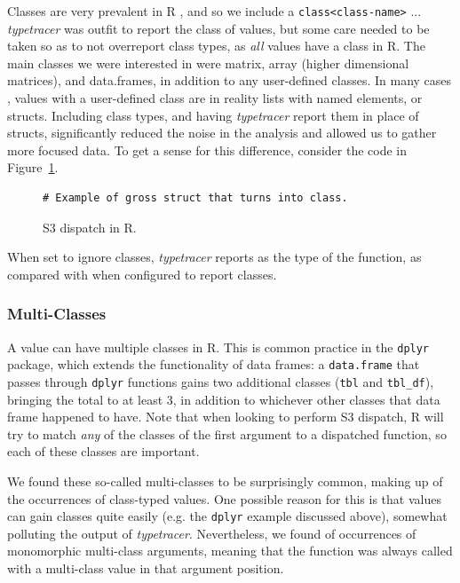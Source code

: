 \documentclass[acmsmall,review,anonymous]{acmart}\settopmatter{printfolios=true,printccs=false,printacmref=false}
\newcommand{\code}[1]{{\lstinline[style=Rin]!#1!}\xspace}
\newcommand{\typetracer}{\emph{typetracer}\xspace} %
\begin{document}
Classes are very prevalent in R , and so we include a \code{class<class-name>} ... 
\typetracer was outfit to report the class of values, but some care needed to be taken so as to not overreport class types, as {\it all} values have a class in R.
The main classes we were interested in were matrix, array (higher dimensional matrices), and data.frames, in addition to any user-defined classes.
In many cases , values with a user-defined class are in reality lists with named elements, or structs.
Including class types, and having \typetracer report them in place of structs, significantly reduced the noise in the analysis and allowed us to gather more focused data.
To get a sense for this difference, consider the code in Figure~\ref{fig:class-vs-struct}.

\begin{figure}[htbp]
\begin{center}

\begin{lstlisting}
# Example of gross struct that turns into class.
\end{lstlisting}

\caption{S3 dispatch in R.}
\label{fig:class-vs-struct}
\end{center}
\end{figure}

When set to ignore classes, \typetracer reports  as the type of the function, as compared with  when configured to report classes.

%
%
\subsubsection{Multi-Classes}

A value can have multiple classes in R.
This is common practice in the \code{dplyr} package, which extends the functionality of data frames: a \code{data.frame} that passes through \code{dplyr} functions gains two additional classes (\code{tbl} and \code{tbl_df}), bringing the total to at least 3, in addition to whichever other classes that data frame happened to have.
Note that when looking to perform S3 dispatch, R will try to match {\it any} of the classes of the first argument to a dispatched function, so each of these classes are important.

We found these so-called multi-classes to be surprisingly common, making up  of the occurrences of class-typed values.
One possible reason for this is that values can gain classes quite easily (e.g. the \code{dplyr} example discussed above), somewhat polluting the output of \typetracer.
Nevertheless, we found  of occurrences of monomorphic multi-class arguments, meaning that the function was always called with a multi-class value in that argument position.
\end{document}
